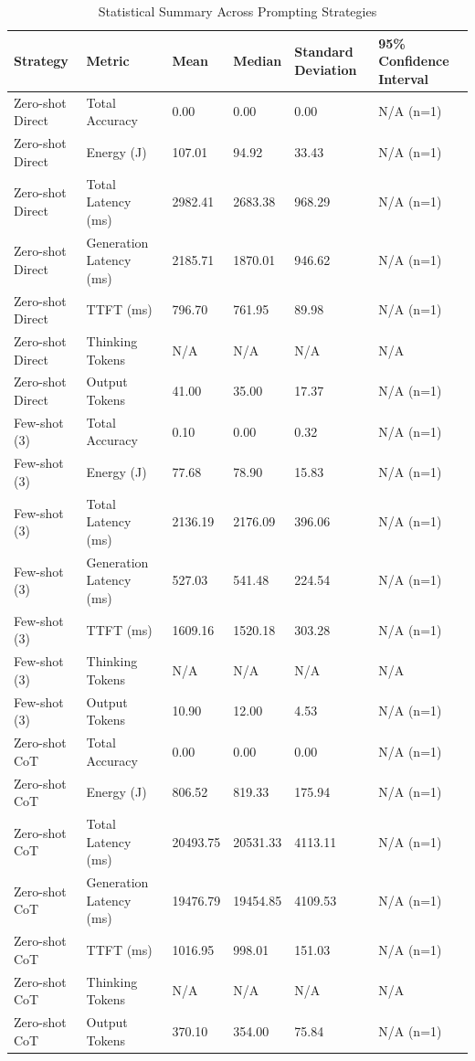 \begin{table}
\caption{Statistical Summary Across Prompting Strategies}
\label{tab:statistical_summary}
\begin{tabular}{llllll}
\toprule
Strategy & Metric & Mean & Median & Standard Deviation & 95\% Confidence Interval \\
\midrule
Zero-shot Direct & Total Accuracy & 0.00 & 0.00 & 0.00 & N/A (n=1) \\
Zero-shot Direct & Energy (J) & 107.01 & 94.92 & 33.43 & N/A (n=1) \\
Zero-shot Direct & Total Latency (ms) & 2982.41 & 2683.38 & 968.29 & N/A (n=1) \\
Zero-shot Direct & Generation Latency (ms) & 2185.71 & 1870.01 & 946.62 & N/A (n=1) \\
Zero-shot Direct & TTFT (ms) & 796.70 & 761.95 & 89.98 & N/A (n=1) \\
Zero-shot Direct & Thinking Tokens & N/A & N/A & N/A & N/A \\
Zero-shot Direct & Output Tokens & 41.00 & 35.00 & 17.37 & N/A (n=1) \\
Few-shot (3) & Total Accuracy & 0.10 & 0.00 & 0.32 & N/A (n=1) \\
Few-shot (3) & Energy (J) & 77.68 & 78.90 & 15.83 & N/A (n=1) \\
Few-shot (3) & Total Latency (ms) & 2136.19 & 2176.09 & 396.06 & N/A (n=1) \\
Few-shot (3) & Generation Latency (ms) & 527.03 & 541.48 & 224.54 & N/A (n=1) \\
Few-shot (3) & TTFT (ms) & 1609.16 & 1520.18 & 303.28 & N/A (n=1) \\
Few-shot (3) & Thinking Tokens & N/A & N/A & N/A & N/A \\
Few-shot (3) & Output Tokens & 10.90 & 12.00 & 4.53 & N/A (n=1) \\
Zero-shot CoT & Total Accuracy & 0.00 & 0.00 & 0.00 & N/A (n=1) \\
Zero-shot CoT & Energy (J) & 806.52 & 819.33 & 175.94 & N/A (n=1) \\
Zero-shot CoT & Total Latency (ms) & 20493.75 & 20531.33 & 4113.11 & N/A (n=1) \\
Zero-shot CoT & Generation Latency (ms) & 19476.79 & 19454.85 & 4109.53 & N/A (n=1) \\
Zero-shot CoT & TTFT (ms) & 1016.95 & 998.01 & 151.03 & N/A (n=1) \\
Zero-shot CoT & Thinking Tokens & N/A & N/A & N/A & N/A \\
Zero-shot CoT & Output Tokens & 370.10 & 354.00 & 75.84 & N/A (n=1) \\

\end{tabular}
\end{table}
